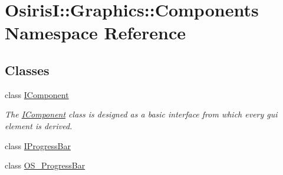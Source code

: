 \hypertarget{namespace_osiris_i_1_1_graphics_1_1_components}{\section{Osiris\-I\-:\-:Graphics\-:\-:Components Namespace Reference}
\label{namespace_osiris_i_1_1_graphics_1_1_components}
}
\subsection*{Classes}
\begin{DoxyCompactItemize}
\item 
class \hyperlink{class_osiris_i_1_1_graphics_1_1_components_1_1_i_component}{I\-Component}
\begin{DoxyCompactList}\small\item\em The \hyperlink{class_osiris_i_1_1_graphics_1_1_components_1_1_i_component}{I\-Component} class is designed as a basic interface from which every gui element is derived. \end{DoxyCompactList}\item 
class \hyperlink{class_osiris_i_1_1_graphics_1_1_components_1_1_i_progress_bar}{I\-Progress\-Bar}
\item 
class \hyperlink{class_osiris_i_1_1_graphics_1_1_components_1_1_o_s___progress_bar}{O\-S\-\_\-\-Progress\-Bar}
\end{DoxyCompactItemize}
